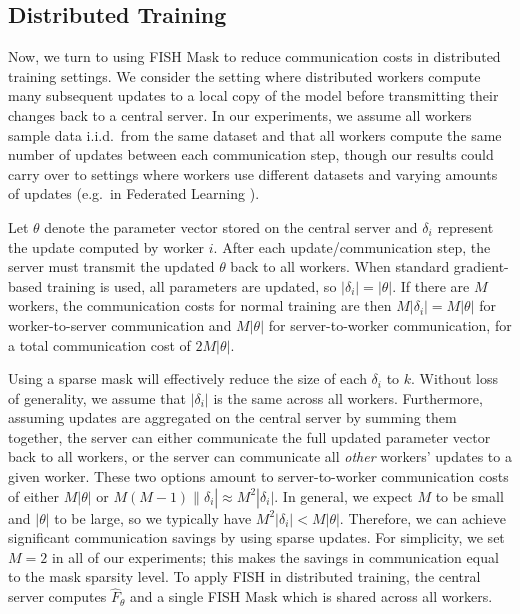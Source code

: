 \subsection{Distributed Training}
 \label{sec:distributed}

Now, we turn to using FISH Mask to reduce communication costs in distributed training settings. We consider the setting where distributed workers compute many subsequent updates to a local copy of the model before transmitting their changes back to a central server. In our experiments, we assume all workers sample data i.i.d.\ from the same dataset and that all workers compute the same number of updates between each communication step, though our results could carry over to settings where workers use different datasets and varying amounts of updates (e.g.\ in Federated Learning \citep{mcmahan2017communicationefficient}).

Let $\theta$ denote the parameter vector stored on the central server and $\delta_i$ represent the update computed by worker $i$. After each update/communication step, the server must transmit the updated $\theta$ back to all workers. When standard gradient-based training is used, all parameters are updated, so $|\delta_i| = |\theta|$.
If there are $M$ workers, the communication costs for normal training are then $M|\delta_i| = M|\theta|$ for worker-to-server communication and $M|\theta|$ for server-to-worker communication, for a total communication cost of $2M|\theta|$.

Using a sparse mask will effectively reduce the size of each $\delta_i$ to $k$. Without loss of generality, we assume that $|\delta_i|$ is the same across all workers. Furthermore, assuming updates are aggregated on the central server by summing them together, the server can either communicate the full updated parameter vector back to all workers, or the server can communicate all \textit{other} workers' updates to a given worker. These two options amount to server-to-worker communication costs of either $M|\theta|$ or $M(M - 1)\|\delta_i| \approx M^2|\delta_i|$.
In general, we expect $M$ to be small and $|\theta|$ to be large, so we typically have $M^2|\delta_i| < M|\theta|$.
Therefore, we can achieve significant communication savings by using sparse updates. For simplicity, we set $M = 2$ in all of our experiments; this makes the savings in communication equal to the mask sparsity level. To apply FISH in distributed training, the central server computes $\hat{F}_\theta$ and a single FISH Mask which is shared across all workers.

